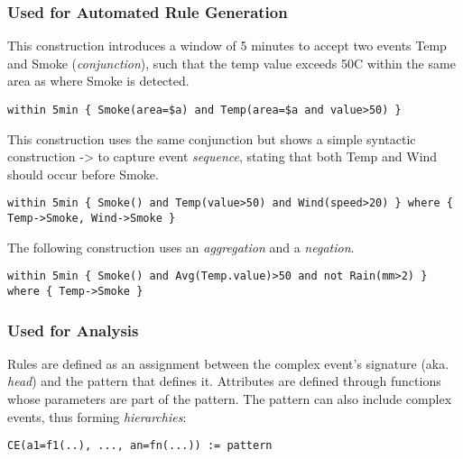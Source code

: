 \subsubsection{Used for Automated Rule Generation \cite{Margara-Cugola-Tamburrelli:2014}}
\label{sec:AS-RG}

This construction introduces a window of 5 minutes to accept two events \textsf{Temp} and \textsf{Smoke} (\emph{conjunction}), such that the temp value exceeds 50\textdegree C within the same area as where \textsf{Smoke} is detected.

\begin{lstlisting}[language=iotdsl]
within 5min { Smoke(area=$a) and Temp(area=$a and value>50) }
\end{lstlisting}

This construction uses the same conjunction but shows a simple syntactic construction \textsf{->} to capture event \emph{sequence}, stating that both \textsf{Temp} and \textsf{Wind} should occur before \textsf{Smoke}.

\begin{lstlisting}[language=iotdsl]
within 5min { Smoke() and Temp(value>50) and Wind(speed>20) } where { Temp->Smoke, Wind->Smoke }
\end{lstlisting}

The following construction uses an \emph{aggregation} and a \emph{negation}.

\begin{lstlisting}[language=iotdsl]
within 5min { Smoke() and Avg(Temp.value)>50 and not Rain(mm>2) } where { Temp->Smoke }
\end{lstlisting}

\subsubsection{Used for Analysis \cite{Cugola-Margara-Pezze-Pradella:2015}}
\label{sec:AS-Analysis}

Rules are defined as an assignment between the complex event's signature (aka. \emph{head}) and the pattern that defines it. Attributes are defined through functions whose parameters are part of the \textsf{pattern}. The \textsf{pattern} can also include complex events, thus forming \emph{hierarchies}:

\begin{lstlisting}[language=iotdsl]
CE(a1=f1(..), ..., an=fn(...)) := pattern
\end{lstlisting}

